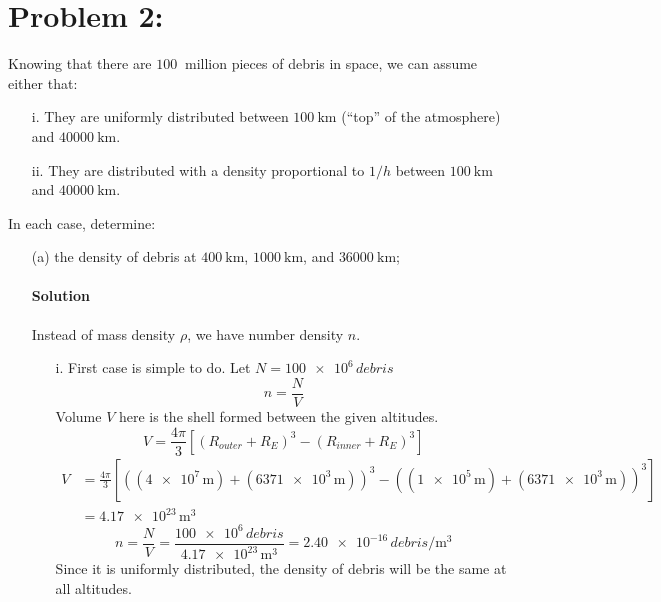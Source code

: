 \documentclass{article}
\begin{document}
{\begin{enumerate}
	\end{enumerate}
	
	\clearpage
	
	\section*{Problem 2: }
	\boldmath
	Knowing that there are $\SI{100}{}$ million pieces of debris in space, we can assume either that: \\
	\begin{enumerate}[itemsep=0mm]
		\item[i.] They are uniformly distributed between $\SI{100}{\kilo\meter}$ (“top” of the atmosphere) and $\SI{40000}{\kilo\meter}$.
		\item[ii.] They are distributed with a density proportional to $1/h$ between $\SI{100}{\kilo\meter}$ and $\SI{40000}{\kilo\meter}$. \\
	\end{enumerate}
	In each case, determine: \\
	\begin{enumerate}
		\item[(a)] the density of debris at $\SI{400}{\kilo\meter}$, $\SI{1000}{\kilo\meter}$, and $\SI{36000}{\kilo\meter}$;
		\paragraph{Solution} Instead of mass density $\rho$, we have number density $n$. \unboldmath \\ 
		
		\begin{enumerate}
			\item[i.] First case is simple to do.
				Let $N = \num{100e6} \, debris$
				\[
				n = \frac{N}{V}
				\]
				Volume $V$ here is the shell formed between the given altitudes.
				\[
				V = \frac{4\pi}{3} \left[ ( R_{outer} + R_E )^3 - ( R_{inner} + R_E )^3 \right] 
				\]
				\begin{equation*}
					\begin{split}
						V &= \frac{4\pi}{3} \left[ ( ( \num{4e7} \, \unit{\meter} ) + ( \num{6371e3} \, \unit{\meter} ) )^3 - ( ( \num{1e5} \, \unit{\meter} ) + ( \num{6371e3} \, \unit{\meter} ) )^3 \right] \\
						&= \num{4.17e23} \, \unit{\meter\cubed}
					\end{split}
				\end{equation*}
				\[
				n = \frac{N}{V} = \frac{\num{100e6} \, debris}{\num{4.17e23} \, \unit{\meter\cubed}} = \num{2.40e-16} \, \unit{debris \per\meter\cubed}
				\]
				Since it is uniformly distributed, the density of debris will be the same at all altitudes.
				

\end{enumerate}
\end{enumerate}}
\end{document}
